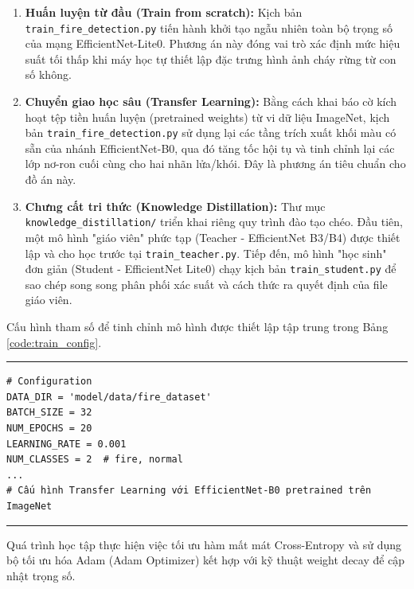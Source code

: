 \documentclass[12pt,a4paper]{report}
\begin{document}
\begin{enumerate}
    \item \textbf{Huấn luyện từ đầu (Train from scratch):} Kịch bản \texttt{train\_fire\_detection.py} tiến hành khởi tạo ngẫu nhiên toàn bộ trọng số của mạng EfficientNet-Lite0. Phương án này đóng vai trò xác định mức hiệu suất tối thấp khi máy học tự thiết lập đặc trưng hình ảnh cháy rừng từ con số không.
    \item \textbf{Chuyển giao học sâu (Transfer Learning):} Bằng cách khai báo cờ kích hoạt tệp tiền huấn luyện (pretrained weights) từ vi dữ liệu ImageNet, kịch bản \texttt{train\_fire\_detection.py} sử dụng lại các tầng trích xuất khối màu có sẵn của nhánh EfficientNet-B0, qua đó tăng tốc hội tụ và tinh chỉnh lại các lớp nơ-ron cuối cùng cho hai nhãn lửa/khói. Đây là phương án tiêu chuẩn cho đồ án này.
    \item \textbf{Chưng cất tri thức (Knowledge Distillation):} Thư mục \texttt{knowledge\_distillation/} triển khai riêng quy trình đào tạo chéo. Đầu tiên, một mô hình "giáo viên" phức tạp (Teacher - EfficientNet B3/B4) được thiết lập và cho học trước tại \texttt{train\_teacher.py}. Tiếp đến, mô hình "học sinh" đơn giản (Student - EfficientNet Lite0) chạy kịch bản \texttt{train\_student.py} để sao chép song song phân phối xác suất và cách thức ra quyết định của file giáo viên.
\end{enumerate}

Cấu hình tham số để tinh chỉnh mô hình được thiết lập tập trung trong Bảng \ref{code:train_config}.

\begin{table}[htbp]
  \centering
  \caption{Mã cấu hình thuật toán huấn luyện nhánh mô hình cốt lõi}
  \label{code:train_config}
  \hrule
  \vspace{2mm}
  \begin{minipage}{0.9\textwidth}
    \small
\begin{verbatim}
# Configuration
DATA_DIR = 'model/data/fire_dataset'
BATCH_SIZE = 32
NUM_EPOCHS = 20
LEARNING_RATE = 0.001
NUM_CLASSES = 2  # fire, normal
...
# Cấu hình Transfer Learning với EfficientNet-B0 pretrained trên ImageNet
\end{verbatim}
  \end{minipage}
  \vspace{2mm}
  \hrule
\end{table}

Quá trình học tập thực hiện việc tối ưu hàm mất mát Cross-Entropy và sử dụng bộ tối ưu hóa Adam (Adam Optimizer) kết hợp với kỹ thuật weight decay để cập nhật trọng số.
\end{document}
